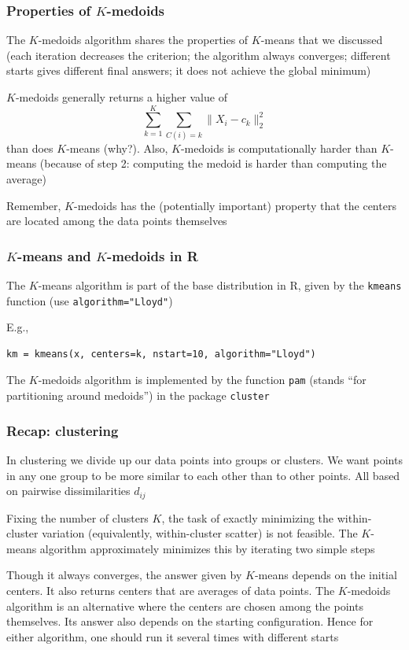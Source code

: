 \documentclass[mathserif]{beamer}
\def\blue{\color[rgb]{0,0,0.8}}
\begin{document}
\begin{frame}
\frametitle{Properties of $K$-medoids}
The $K$-medoids algorithm 
{\blue shares the properties}
of $K$-means that we discussed (each iteration 
decreases the criterion; the algorithm
always converges; different starts gives
different final answers; it does 
not achieve the global minimum)

\bigskip
$K$-medoids generally returns
a {\blue higher value} of 
$$\sum_{k=1}^K \sum_{C(i)=k} \|X_i-c_k\|_2^2$$
than does $K$-means (why?).
Also, $K$-medoids is {\blue computationally
harder} than $K$-means (because of step 
2: computing the medoid is harder than
computing the average)

\bigskip
Remember, $K$-medoids has the (potentially 
important) property that the centers are located among
the data points themselves
\end{frame}

\begin{frame}[fragile]
\frametitle{$K$-means and $K$-medoids in R}
The $K$-means algorithm is part of the base 
distribution in R, given by the {\tt kmeans} function 
(use {\tt algorithm="Lloyd"})

\bigskip
E.g.,
\begin{verbatim}
km = kmeans(x, centers=k, nstart=10, algorithm="Lloyd")
\end{verbatim}

\bigskip
The $K$-medoids algorithm is implemented by the
function {\tt pam} (stands ``for partitioning
around medoids'') in the package {\tt cluster}
\end{frame}

\begin{frame}
\frametitle{Recap: clustering}
In {\blue clustering} we divide up our data points
into groups or clusters. We want points
in any one group to be more similar to each other
than to other points. All based on pairwise
dissimilarities $d_{ij}$

\bigskip
Fixing the number of clusters $K$, the task of 
exactly minimizing the 
{\blue within-cluster
variation} (equivalently, 
{\blue within-cluster scatter})
is not feasible. The {\blue $K$-means algorithm} 
approximately minimizes this by iterating two
simple steps

\bigskip
Though it always converges, the answer given
by $K$-means depends on the initial centers. It 
also returns centers that are averages of data
points. The {\blue $K$-medoids algorithm} is an
alternative where the centers are chosen among 
the points themselves. Its answer also depends on the 
starting configuration.
Hence for either algorithm, one should {\blue run it
several times} with different starts
\end{frame}
\end{document}
